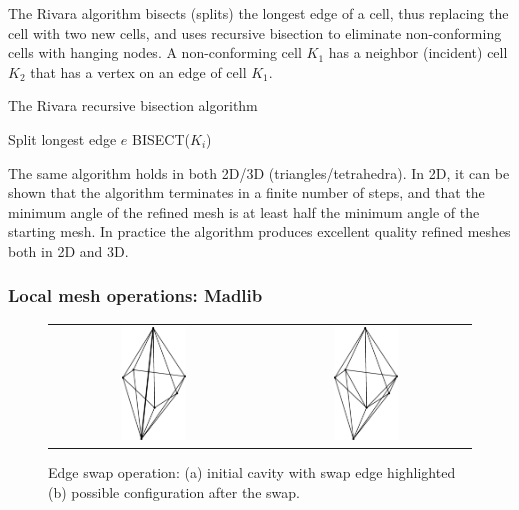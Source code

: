The Rivara algorithm bisects (splits) the longest edge of a cell, thus
replacing the cell with two new cells, and uses recursive bisection to
eliminate non-conforming cells with hanging nodes. A non-conforming
cell $K_1$ has a neighbor (incident) cell $K_2$ that has a vertex on
an edge of cell $K_1$.

\begin{algorithm}
\caption{The Rivara recursive bisection algorithm}
\label{alg:rivara}
\begin{algorithmic}
\State Split longest edge $e$
\State BISECT($K_i$)
\EndWhile
\EndProcedure
\end{algorithmic}
\end{algorithm}

The same algorithm holds in both 2D/3D (triangles/tetrahedra). In 2D,
it can be shown \cite{Rivara1992} that the algorithm terminates in a
finite number of steps, and that the minimum angle of the refined mesh
is at least half the minimum angle of the starting mesh. In practice
the algorithm produces excellent quality refined meshes both in 2D and
3D.

\subsubsection{Local mesh operations: Madlib}

 \begin{figure}[!h]
 \begin{center}
 \begin{tabular}{cc}
 \centering
 \includegraphics[height=3cm,width=6cm]{chapters/hoffman-2/eps/swap.eps} &
 \hspace{0.3cm}
 \includegraphics[height=3cm,width=6cm]{chapters/hoffman-2/eps/swap_config1.eps}
 \end{tabular}
 \end{center}
 \caption{Edge swap operation: (a) initial cavity with swap edge highlighted (b) possible configuration after the swap.}
 \label{fig:op:eswap}
 \end{figure}

